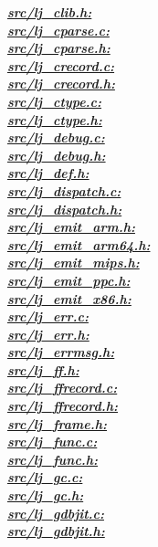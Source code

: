 \underline{\textbf{\emph{src/lj\_clib.h:}}}\\
\underline{\textbf{\emph{src/lj\_cparse.c:}}}\\
\underline{\textbf{\emph{src/lj\_cparse.h:}}}\\
\underline{\textbf{\emph{src/lj\_crecord.c:}}}\\
\underline{\textbf{\emph{src/lj\_crecord.h:}}}\\
\underline{\textbf{\emph{src/lj\_ctype.c:}}}\\
\underline{\textbf{\emph{src/lj\_ctype.h:}}}\\
\underline{\textbf{\emph{src/lj\_debug.c:}}}\\
\underline{\textbf{\emph{src/lj\_debug.h:}}}\\
\underline{\textbf{\emph{src/lj\_def.h:}}}\\
\underline{\textbf{\emph{src/lj\_dispatch.c:}}}\\
\underline{\textbf{\emph{src/lj\_dispatch.h:}}}\\
\underline{\textbf{\emph{src/lj\_emit\_arm.h:}}}\\
\underline{\textbf{\emph{src/lj\_emit\_arm64.h:}}}\\
\underline{\textbf{\emph{src/lj\_emit\_mips.h:}}}\\
\underline{\textbf{\emph{src/lj\_emit\_ppc.h:}}}\\
\underline{\textbf{\emph{src/lj\_emit\_x86.h:}}}\\
\underline{\textbf{\emph{src/lj\_err.c:}}}\\
\underline{\textbf{\emph{src/lj\_err.h:}}}\\
\underline{\textbf{\emph{src/lj\_errmsg.h:}}}\\
\underline{\textbf{\emph{src/lj\_ff.h:}}}\\
\underline{\textbf{\emph{src/lj\_ffrecord.c:}}}\\
\underline{\textbf{\emph{src/lj\_ffrecord.h:}}}\\
\underline{\textbf{\emph{src/lj\_frame.h:}}}\\
\underline{\textbf{\emph{src/lj\_func.c:}}}\\
\underline{\textbf{\emph{src/lj\_func.h:}}}\\
\underline{\textbf{\emph{src/lj\_gc.c:}}}\\
\underline{\textbf{\emph{src/lj\_gc.h:}}}\\
\underline{\textbf{\emph{src/lj\_gdbjit.c:}}}\\
\underline{\textbf{\emph{src/lj\_gdbjit.h:}}}\\
